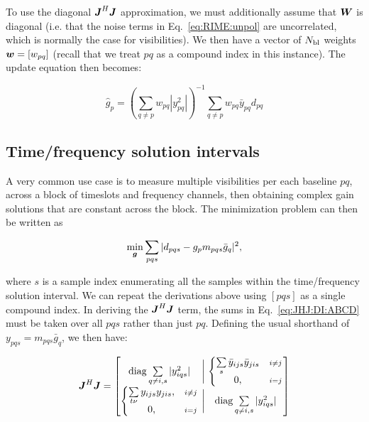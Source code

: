 \documentclass[useAMS,usenatbib]{mn2e}
\newcommand{\mat}[1]{{\bmath{#1}}}
\newcommand{\JJ}{\mat{J}} %
\newcommand{\JHJ}{\JJ^H\JJ} %
\begin{document}
To use the diagonal $\JJ^H\JJ$ approximation, we must additionally assume that $\mat{W}$ is diagonal (i.e. that the noise terms
in Eq.~\ref{eq:RIME:unpol} are uncorrelated, which is normally the case for visibilities). We then have a vector of $N_\mathrm{bl}$ weights
$\bmath{w}=[w_{pq}]$ (recall that we treat $pq$ as a compound index in this instance). The update equation then becomes:

\begin{equation}
\label{eq:JHJ:diag:W}
\hat{g}_p = \left( \sum\limits_{q\ne p} w_{pq} |y^2_{pq}| \right )^{-1} \sum\limits_{q\ne p} w_{pq} \bar{y}_{pq} d_{pq}
\end{equation}

\subsection{Time/frequency solution intervals}
\label{sec:DI:avg}

A very common use case is to measure multiple visibilities per each baseline $pq$, across a block of timeslots and frequency 
channels, then obtaining complex gain solutions that are constant across the block. The minimization problem can then
be written as

\begin{equation}
\label{eq:cal:DI:tf}
\min_{\bmath{g}}\sum_{pqs}|d_{pqs}-g_p m_{pqs} \bar{g}_q|^2, 
\end{equation}

where $s$ is a sample index enumerating all the samples within the time/frequency solution interval.
We can repeat the derivations above using  $[pqs]$ as a single compound index. In deriving the $\JHJ$ term, 
the sums in Eq.~\ref{eq:JHJ:DI:ABCD} must be taken over all $pqs$ rather than just $pq$. Defining the usual shorthand of 
$y_{pqs}=m_{pqs}\bar{g}_q$, we then have:

\begin{equation}
\label{eq:JHJ:DI:tf}
\JJ^H \JJ = \Matrix{c@{~\bigg |~}c}{
\mathrm{diag} \sum\limits_{q\ne i,s} |y^2_{iqs}| & 
  \left \{ 
  \begin{array}{@{}cc@{}}
   \sum\limits_{s} \bar{y}_{ijs} \bar{y}_{jis} &{\scriptstyle i\ne j} \\
   0, &{\scriptstyle i=j}
  \end{array} \right .\\
  \left \{ 
  \begin{array}{@{}cc@{}}
   \sum\limits_{t\nu} y_{ijs}y_{jis},&{\scriptstyle i\ne j} \\
   0, &{\scriptstyle i=j}
  \end{array} \right . 
  & \mathrm{diag} \sum\limits_{q\ne i,s} |y^2_{iqs}| 
}
\end{equation}
\end{document}
